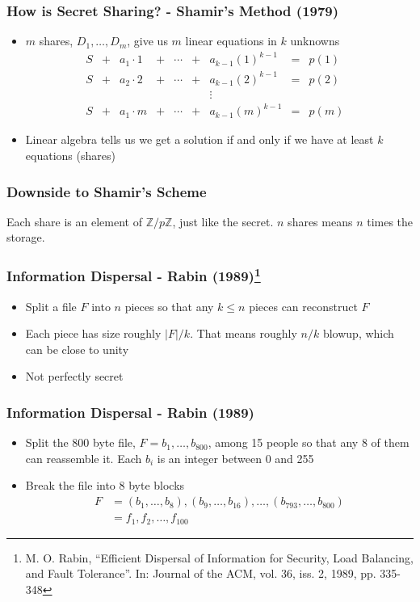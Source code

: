 \documentclass{beamer}
\newcommand{\integers}{\mathbb{Z}}
\begin{document}
\begin{frame}
	\frametitle{How is Secret Sharing? - Shamir's Method (1979)}
	\begin{itemize}
		\item $m$ shares, $D_1,\ldots, D_m$, give us $m$ linear equations in $k$ unknowns\pause
		\[
			\begin{array}{ccccccccccc}
				S & + & a_1\cdot 1  &+& \cdots& + & a_{k-1}(1)^{k-1} & = & p(1)\\
				S & + & a_2\cdot 2  &+& \cdots& + & a_{k-1}(2)^{k-1} & = & p(2)\\
				&&&&&&\vdots&&&\\
				S & + & a_1\cdot m &+& \cdots& + & a_{k-1}(m)^{k-1} & = & p(m)
			\end{array}
		\]
		\item Linear algebra tells us we get a solution if and only if we have at least $k$ equations (shares)
	\end{itemize}
\end{frame}

\begin{frame}
	\frametitle{Downside to Shamir's Scheme}
	Each share is an element of $\integers/p\integers$, just like the secret. $n$ shares means $n$ times the storage.
\end{frame}

\begin{frame}
	\frametitle{Information Dispersal - Rabin (1989)\footnote{M. O. Rabin, ``Efficient Dispersal of Information for Security, Load Balancing, and Fault Tolerance''. In: Journal of the ACM, vol. 36, iss. 2, 1989, pp. 335-348}}
	
	\begin{itemize}
		\item Split a file $F$ into $n$ pieces so that any $k\leq n$ pieces can reconstruct $F$\pause
		\item Each piece has size roughly $|F|/k$. That means roughly $n/k$ blowup, which can be close to unity\pause
		\item Not perfectly secret
	\end{itemize}	
\end{frame}

\begin{frame}
	\frametitle{Information Dispersal - Rabin (1989)}

	\begin{itemize}
		\item Split the 800 byte file, $F = b_1, \ldots, b_{800}$, among 15 people so that any 8 of them can reassemble it. Each $b_i$ is an integer between 0 and 255\pause
		\item Break the file into 8 byte blocks
		\begin{align*}
		F &= (b_1, \ldots, b_8), (b_9, \ldots, b_{16}), \ldots, (b_{793}, \ldots, b_{800})\\
		&= f_1, f_2, \ldots, f_{100}
		\end{align*}
	\end{itemize}

\end{frame}
\end{document}
